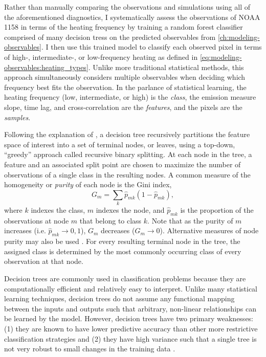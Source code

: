 Rather than manually comparing the observations and simulations using all of the aforementioned diagnostics, I systematically assess the observations of NOAA 1158 in terms of the heating frequency by training a random forest classifier comprised of many decision tress on the predicted observables from \autoref{ch:modeling-observables}. I then use this trained model to classify each observed pixel in terms of high-, intermediate-, or low-frequency heating as defined in \autoref{eq:modeling-observables:heating_types}. Unlike more traditional statistical methods, this approach  simultaneously considers multiple observables when deciding which frequency best fits the observation. In the parlance of statistical learning, the heating frequency (low, intermediate, or high) is the \textit{class}, the emission measure slope, time lag, and cross-correlation are the \textit{features}, and the pixels are the \textit{samples}.

Following the explanation of \citet[Chapter 8]{james_introduction_2013}, a decision tree recursively partitions the feature space of interest into a set of terminal nodes, or leaves, using a top-down, ``greedy'' approach called recursive binary splitting. At each node in the tree, a feature and an associated split point are chosen to maximize the number of observations of a single class in the resulting nodes. A common measure of the homogeneity or \textit{purity} of each node is the Gini index,
\begin{equation}\label{eq:classifying-observables:gini-index}
    G_m = \sum_k \hat{p}_{mk} (1 - \hat{p}_{mk}),
\end{equation}
where $k$ indexes the class, $m$ indexes the node, and $\hat{p}_{mk}$ is the proportion of the observations at node $m$ that belong to class $k$. Note that as the purity of $m$ increases (i.e. $\hat{p}_{mk}\to0,1$), $G_m$ decreases ($G_m\to0$). Alternative measures of node purity may also be used \citep[see Section 9.2.3 of][]{hastie_elements_2009}. For every resulting terminal node in the tree, the assigned class is determined by the most commonly occurring class of every observation at that node.

Decision trees are commonly used in classification problems because they are computationally efficient and relatively easy to interpret. Unlike many statistical learning techniques, decision trees do not assume any functional mapping between the inputs and outputs such that arbitrary, non-linear relationships can be learned by the model. However, decision trees have two primary weaknesses: (1) they are known to have lower predictive accuracy than other more restrictive classification strategies and (2) they have high variance such that a single tree is not very robust to small changes in the training data \citep{james_introduction_2013}.

